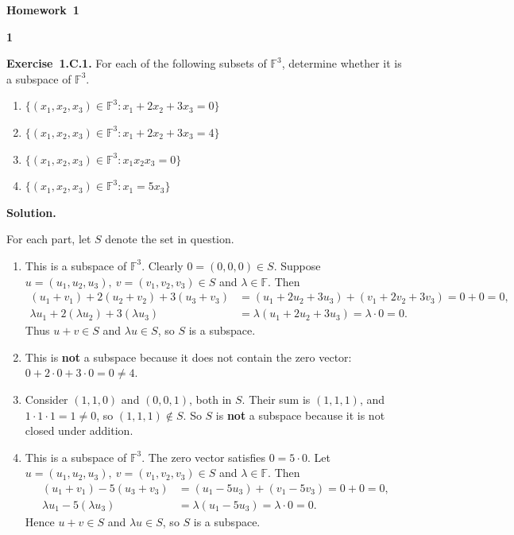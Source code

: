 \documentclass[11pt]{article}
\newcommand{\AssignmentType}{Homework} %
\newcommand{\AssignmentNumber}{1}
\newcommand{\ProblemDivider}[1]{%
  \vspace{1.0em}
  \noindent\textbf{#1}\par
  \vspace{0.35em}
}
\newcommand{\ProblemAnnounce}{\noindent}
\newcommand{\SolutionAnnounce}{\noindent\textbf{Solution.}\par\medskip}
\newcommand{\Exercise}[1]{\textbf{Exercise~#1.}\;}
\newcommand{\F}{\mathbb{F}}
\begin{document}
\begin{center}
  {\Large \textbf{\AssignmentType~\AssignmentNumber}}
\end{center}
\vspace{0.75em}

\ProblemDivider{1}

\begin{problemBox}
\ProblemAnnounce
\Exercise{1.C.1}
For each of the following subsets of $\F^3$, determine whether it is a subspace of $\F^3$.
\begin{enumerate}
  \item[(a)] $\{(x_1,x_2,x_3)\in \F^3 : x_1 + 2x_2 + 3x_3 = 0\}$
  \item[(b)] $\{(x_1,x_2,x_3)\in \F^3 : x_1 + 2x_2 + 3x_3 = 4\}$
  \item[(c)] $\{(x_1,x_2,x_3)\in \F^3 : x_1x_2x_3 = 0\}$
  \item[(d)] $\{(x_1,x_2,x_3)\in \F^3 : x_1 = 5x_3\}$
\end{enumerate}
\end{problemBox}

\begin{solutionBox}
\SolutionAnnounce
\doublespacing

For each part, let $S$ denote the set in question.

\begin{enumerate}
  \item[(a)] This is a subspace of $\F^3$. Clearly $0 = (0,0,0) \in S$. Suppose $u = (u_1,u_2,u_3),\ v = (v_1,v_2,v_3)\in S$ and $\lambda \in \F$. Then
  \begin{align*}
    (u_1+v_1) + 2(u_2+v_2) + 3(u_3+v_3) &= (u_1+2u_2+3u_3) + (v_1+2v_2+3v_3) = 0+0 = 0,\\
    \lambda u_1 + 2(\lambda u_2) + 3(\lambda u_3) &= \lambda(u_1+2u_2+3u_3) = \lambda \cdot 0 = 0.
  \end{align*}
  Thus $u+v \in S$ and $\lambda u \in S$, so $S$ is a subspace.
  
\item[(b)] This is \textbf{not} a subspace because it does not contain the zero vector: $0+2\cdot0+3\cdot0 = 0 \neq 4$.
  
  \item[(c)] Consider $(1,1,0)$ and $(0,0,1)$, both in $S$. Their sum is $(1,1,1)$, and $1\cdot1\cdot1 = 1 \neq 0$, so $(1,1,1) \notin S$. So $S$ is \textbf{not} a subspace because it is not closed under addition.
  
  \item[(d)] This is a subspace of $\F^3$. The zero vector satisfies $0 = 5\cdot0$. Let $u = (u_1,u_2,u_3),\ v = (v_1,v_2,v_3) \in S$ and $\lambda \in \F$. Then
  \begin{align*}
    (u_1+v_1) - 5(u_3+v_3) &= (u_1-5u_3) + (v_1-5v_3) = 0+0 = 0,\\
    \lambda u_1 - 5(\lambda u_3) &= \lambda(u_1-5u_3) = \lambda\cdot0 = 0.
  \end{align*}
  Hence $u+v \in S$ and $\lambda u \in S$, so $S$ is a subspace.
\end{enumerate}
\end{solutionBox}
\end{document}
